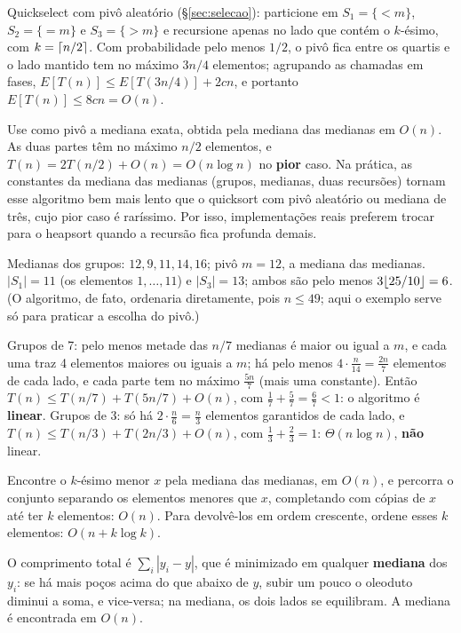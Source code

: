  Quickselect com pivô aleatório (§\ref{sec:selecao}): particione em $S_1=\{<m\}$, $S_2=\{=m\}$ e $S_3=\{>m\}$ e recursione apenas no lado que contém o $k$-ésimo, com $k=\lceil n/2\rceil$. Com probabilidade pelo menos $1/2$, o pivô fica entre os quartis e o lado mantido tem no máximo $3n/4$ elementos; agrupando as chamadas em fases, $E[T(n)]\le E[T(3n/4)]+2cn$, e portanto $E[T(n)]\le8cn=O(n)$.

 Use como pivô a mediana exata, obtida pela mediana das medianas em $O(n)$. As duas partes têm no máximo $n/2$ elementos, e $T(n)=2T(n/2)+O(n)=O(n\log n)$ no \textbf{pior} caso. Na prática, as constantes da mediana das medianas (grupos, medianas, duas recursões) tornam esse algoritmo bem mais lento que o quicksort com pivô aleatório ou mediana de três, cujo pior caso é raríssimo. Por isso, implementações reais preferem trocar para o heapsort quando a recursão fica profunda demais.

 Medianas dos grupos: $12,9,11,14,16$; pivô $m=12$, a mediana das medianas. $|S_1|=11$ (os elementos $1,\dots,11$) e $|S_3|=13$; ambos são pelo menos $3\lfloor25/10\rfloor=6$. (O algoritmo, de fato, ordenaria diretamente, pois $n\le49$; aqui o exemplo serve só para praticar a escolha do pivô.)

 Grupos de 7: pelo menos metade das $n/7$ medianas é maior ou igual a $m$, e cada uma traz 4 elementos maiores ou iguais a $m$; há pelo menos $4\cdot\frac n{14}=\frac{2n}7$ elementos de cada lado, e cada parte tem no máximo $\frac{5n}7$ (mais uma constante). Então $T(n)\le T(n/7)+T(5n/7)+O(n)$, com $\frac17+\frac57=\frac67<1$: o algoritmo é \textbf{linear}. Grupos de 3: só há $2\cdot\frac n6=\frac n3$ elementos garantidos de cada lado, e $T(n)\le T(n/3)+T(2n/3)+O(n)$, com $\frac13+\frac23=1$: $\Theta(n\log n)$, \textbf{não} linear.

 Encontre o $k$-ésimo menor $x$ pela mediana das medianas, em $O(n)$, e percorra o conjunto separando os elementos menores que $x$, completando com cópias de $x$ até ter $k$ elementos: $O(n)$. Para devolvê-los em ordem crescente, ordene esses $k$ elementos: $O(n+k\log k)$.

 O comprimento total é $\sum_i|y_i-y|$, que é minimizado em qualquer \textbf{mediana} dos $y_i$: se há mais poços acima do que abaixo de $y$, subir um pouco o oleoduto diminui a soma, e vice-versa; na mediana, os dois lados se equilibram. A mediana é encontrada em $O(n)$.


